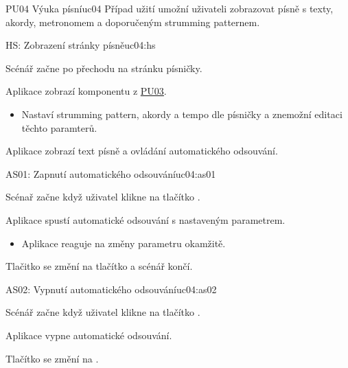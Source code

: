 \begin{usecase}{PU04 Výuka písní}{uc04}
    Případ užití umožní uživateli zobrazovat písně s texty, akordy, metronomem a doporučeným strumming patternem.

    \begin{scenario}{HS: Zobrazení stránky písně}{uc04:hs}
        \item Scénář začne po přechodu na stránku písničky.
        \item Aplikace zobrazí komponentu z \hyperref[uc03]{PU03}.
        \begin{itemize}
            \item Nastaví strumming pattern, akordy a tempo dle písničky a znemožní editaci těchto paramterů.
        \end{itemize}
        \item Aplikace zobrazí text písně a ovládání automatického odsouvání.
    \end{scenario}
   
    \begin{scenario}{AS01: Zapnutí automatického odsouvání}{uc04:as01}
        \item Scénař začne když uživatel klikne na tlačítko .
        \item Aplikace spustí automatické odsouvání s nastaveným parametrem.
        \begin{itemize}
            \item Aplikace reaguje na změny parametru okamžitě.
        \end{itemize}
        \item Tlačitko  se změní na tlačítko  a scénář končí.
    \end{scenario}

    \begin{scenario}{AS02: Vypnutí automatického odsouvání}{uc04:as02}
        \item Scénář začne když uživatel klikne na tlačítko .
        \item Aplikace vypne automatické odsouvání.
        \item Tlačítko  se změní na .
    \end{scenario}
\end{usecase}
